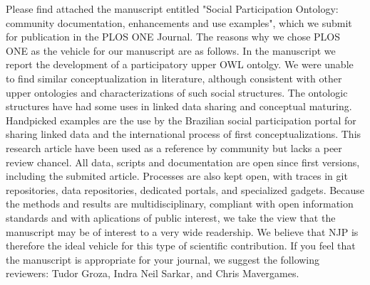 \documentclass[10pt,stdletter,dateno,sigleft]{newlfm} %
\begin{document}
\begin{newlfm}


	Please find attached the manuscript entitled "Social Participation Ontology: community documentation, enhancements and use examples", which we submit for publication in the PLOS ONE Journal. The reasons why we chose PLOS ONE as the vehicle for our manuscript are as follows.
	In the manuscript we report the development of a participatory upper OWL ontolgy.
	We were unable to find similar conceptualization in literature, although consistent with other upper ontologies and characterizations of such social structures.
	The ontologic structures have had some uses in linked data sharing and conceptual maturing.
	Handpicked examples are the use by the Brazilian social participation portal for sharing linked data
	and the international process of first conceptualizations.
	This research article have been used as a reference by community but lacks a peer review chancel.
	All data, scripts and documentation are open since first versions, including the submited article.
	Processes are also kept open, with traces in git repositories, data repositories,
	dedicated portals, and specialized gadgets.
	Because the methods and results are multidisciplinary, compliant with open information standards and with aplications of public interest,
	we take the view that the manuscript may be of interest to a very wide readership.
	 We believe that NJP is therefore the ideal vehicle for this type of scientific contribution.
	 If
	 you feel that the manuscript is appropriate for your journal, we suggest the following reviewers: 
	 Tudor Groza,
	 Indra Neil Sarkar,                                                        and 
	 Chris Mavergames.

%
%





\end{newlfm}
\end{document}
